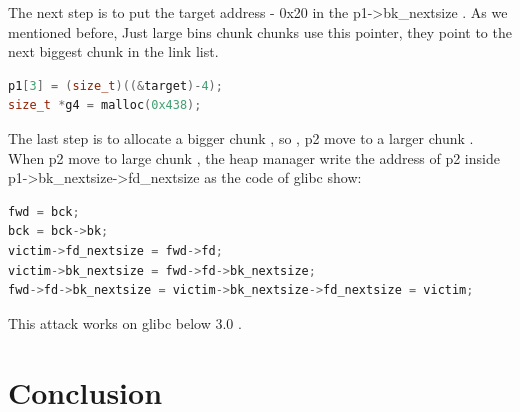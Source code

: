 \documentclass{masterthesis}
\begin{document}
The next step is to put the target address - 0x20 in the p1->bk\_nextsize . As we mentioned before, Just large bins chunk chunks use this pointer, they point to the next biggest chunk in the link list. 
\begin{lstlisting}[language=c,frame=tlrb]
p1[3] = (size_t)((&target)-4);
size_t *g4 = malloc(0x438);
\end{lstlisting}
The last step is to allocate a bigger chunk , so , p2 move to a larger chunk . When p2 move to large chunk , the heap manager write the address of p2 inside p1->bk\_nextsize->fd\_nextsize as the code of glibc show:
\begin{lstlisting}[language=c,frame=tlrb]
fwd = bck;
bck = bck->bk;
victim->fd_nextsize = fwd->fd;
victim->bk_nextsize = fwd->fd->bk_nextsize;
fwd->fd->bk_nextsize = victim->bk_nextsize->fd_nextsize = victim;
\end{lstlisting}
This attack works on glibc below 3.0 .
\chapter{Conclusion}



\end{document}
